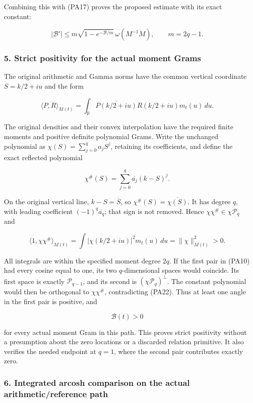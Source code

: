 Combining this with (PA17) proves the proposed estimate with its exact constant:

\[
\boxed{
|\mathcal B'|
\le m\sqrt{1-e^{-\mathcal B/m}}\,\omega(M^{-1}\dot M),
\qquad m=2q-1.
}
\tag{PA19}
\]

\subsubsection{5. Strict positivity for the actual moment Grams}\label{endpoint-principal_angle_volume_review--strict-positivity-for-the-actual-moment-grams}

The original arithmetic and Gamma norms have the common vertical coordinate \(S=k/2+iu\) and the form

\[
\langle P,R\rangle_{M(t)}
=\int_{\mathbb R}\overline{P(k/2+iu)}R(k/2+iu)m_t(u)\,du.
\tag{PA20}
\]

The original densities and their convex interpolation have the required finite moments and positive definite polynomial Grams. Write the unchanged polynomial as \(\chi(S)=\sum_{j=0}^q a_jS^j\), retaining its coefficients, and define the exact reflected polynomial

\[
\chi^\#(S)=\sum_{j=0}^q\overline{a_j}(k-S)^j.
\tag{PA21}
\]

On the original vertical line, \(k-S=\overline S\), so \(\chi^\#(S)=\overline{\chi(S)}\). It has degree \(q\), with leading coefficient \((-1)^q\overline{a_q}\); that sign is not removed. Hence \(\chi\chi^\#\in\chi\mathcal P_q\) and

\[
\langle1,\chi\chi^\#\rangle_{M(t)}
=\int|\chi(k/2+iu)|^2m_t(u)\,du
=\|\chi\|_{M(t)}^2>0.
\tag{PA22}
\]

All integrals are within the specified moment degree \(2q\). If the first pair in (PA10) had every cosine equal to one, its two \(q\)-dimensional spaces would coincide. Its first space is exactly \(\mathcal P_{q-1}\), and its second is \((\chi\mathcal P_q)^\perp\). The constant polynomial would then be orthogonal to \(\chi\chi^\#\), contradicting (PA22). Thus at least one angle in the first pair is positive, and

\[
\boxed{\mathcal B(t)>0}
\tag{PA23}
\]

for every actual moment Gram in this path. This proves strict positivity without a presumption about the zero locations or a discarded relation primitive. It also verifies the needed endpoint at \(q=1\), where the second pair contributes exactly zero.

\subsubsection{6. Integrated arcosh comparison on the actual arithmetic/reference path}\label{endpoint-principal_angle_volume_review--integrated-arcosh-comparison-on-the-actual-arithmeticreference-path}

